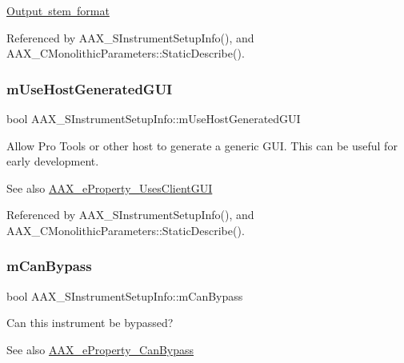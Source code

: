 \mbox{\hyperlink{a00662_a13e384f22825afd3db6d68395b79ce0da211fdc6277e7fa652b5d482e810b0bc9}{Output stem format}} 



Referenced by A\+A\+X\+\_\+\+S\+Instrument\+Setup\+Info(), and A\+A\+X\+\_\+\+C\+Monolithic\+Parameters\+::\+Static\+Describe().

\mbox{\label{a01957_a38bf1193daf9ebd4b0643dec21507caa}} 
\subsubsection{\texorpdfstring{mUseHostGeneratedGUI}{mUseHostGeneratedGUI}}
{\footnotesize\ttfamily bool A\+A\+X\+\_\+\+S\+Instrument\+Setup\+Info\+::m\+Use\+Host\+Generated\+G\+UI}



Allow Pro Tools or other host to generate a generic G\+UI. This can be useful for early development. 

\begin{DoxySeeAlso}{See also}
\mbox{\hyperlink{a00662_a13e384f22825afd3db6d68395b79ce0daf48412738dcfcc56046718d9e5a034d7}{A\+A\+X\+\_\+e\+Property\+\_\+\+Uses\+Client\+G\+UI}} 
\end{DoxySeeAlso}


Referenced by A\+A\+X\+\_\+\+S\+Instrument\+Setup\+Info(), and A\+A\+X\+\_\+\+C\+Monolithic\+Parameters\+::\+Static\+Describe().

\mbox{\label{a01957_a849b67e9badf7ca38a506f8010d4fff1}} 
\subsubsection{\texorpdfstring{mCanBypass}{mCanBypass}}
{\footnotesize\ttfamily bool A\+A\+X\+\_\+\+S\+Instrument\+Setup\+Info\+::m\+Can\+Bypass}



Can this instrument be bypassed? 

\begin{DoxySeeAlso}{See also}
\mbox{\hyperlink{a00662_a13e384f22825afd3db6d68395b79ce0da6819867a9e86913e59decf318416d755}{A\+A\+X\+\_\+e\+Property\+\_\+\+Can\+Bypass}} 
\end{DoxySeeAlso}


